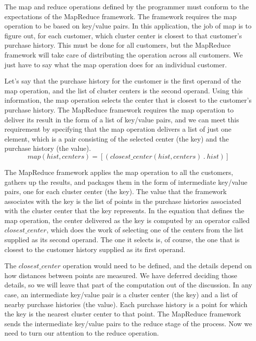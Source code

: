 The map and reduce operations defined by the programmer 
must conform to the expectations of the MapReduce framework. 
The framework requires the map operation to be based on
key/value pairs.  In this application, the job of map is
to figure out, for each customer, which cluster center 
is closest to that customer's purchase history. 
This must be done for all customers, but the MapReduce
framework will take care of distributing the operation across all customers.
We just have to say what the map operation does for an individual customer.

Let's say that the purchase history for the customer is the first operand
of the map operation, and the list of cluster centers is the second operand.
Using this information, the map operation selects the center that is closest
to the customer's purchase history. The MapReduce framework requires the map
operation to deliver its result in the form of a list of key/value pairs,
and we can meet this requirement by specifying that the map operation
delivers a list of just one element, which is a pair consisting of
the selected center (the key) and the purchase history (the value).
\begin{displaymath}
map(hist, centers) = [ ( closest\_center(hist, centers) ~.~ hist ) ]
\end{displaymath}

The MapReduce framework applies the map operation to all the customers,
gathers up the results, and packages them in the form of
intermediate key/value pairs, one for each cluster center (the key).
The value that the framework associates with the key is the list of
points in the purchase histories associated with the cluster center that
the key represents.
In the equation that defines the map operation,
the center delivered as the key is computed by an operator
called $closest\_center$, which does the work of selecting one
of the centers from the list supplied as its second operand.
The one it selects is, of course, the one that is closest to
the customer history supplied as its first operand.

The $closest\_center$ operation would need to be defined,
and the details depend on how distances between
points are measured. We have deferred deciding those
details, so we will leave that part of the computation
out of the discussion.
In any case, an intermediate key/value pair is a cluster center
(the key) and a list of nearby purchase histories
(the value). Each purchase history is a point for which the
key is the nearest cluster center to that point.
The MapReduce framework sends the intermediate key/value pairs
to the reduce stage of the process.
Now we need to turn our attention to the reduce operation.

